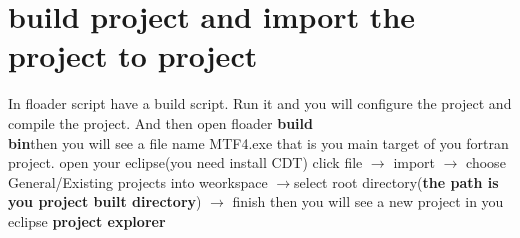 \documentclass[DIV=calc, paper=a4, fontsize=11pt, twocolumn]{scrartcl}	 %
\begin{document}
\section{build project and import the project to project}

In floader script have a build script.
Run it and you will configure the project and compile the project. 
And then open floader \textbf{build\\bin}then you will see a file name MTF4.exe
that is you main target of you fortran project.
open your eclipse(you need install CDT) click file $\rightarrow$ import $\rightarrow$ choose General/Existing projects into weorkspace
 $\rightarrow$select root directory(\textbf{the path is you project built directory})  $\rightarrow$ finish
then you will see a new project in you eclipse \textbf{project explorer}
\end{document}
